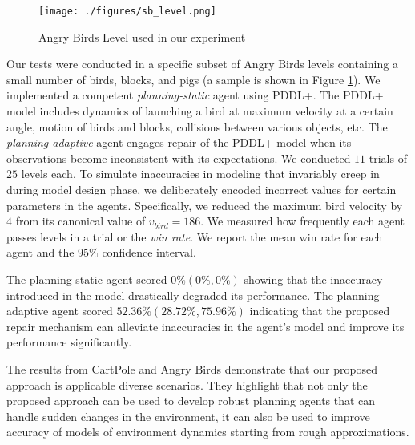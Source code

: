 \documentclass[letterpaper]{article} %
\begin{document}
\begin{figure}
    \centering
    \texttt{[image: ./figures/sb\_level.png]}
    \caption{Angry Birds Level used in our experiment}
    \label{fig:ab_level}
\end{figure}


Our tests were conducted in a specific subset of Angry Birds levels containing a small number of birds, blocks, and pigs (a sample is shown in Figure \ref{fig:ab_level}). We implemented a competent \emph{planning-static} agent using PDDL+. The PDDL+ model includes dynamics of launching a bird at maximum velocity at a certain angle, motion of birds and blocks, collisions between various objects, etc. The \emph{planning-adaptive} agent engages repair of the PDDL+ model when its observations become inconsistent with its expectations. We conducted $11$ trials of $25$ levels each. To simulate inaccuracies in modeling that invariably creep in during model design phase, we deliberately encoded incorrect values for certain parameters in the agents. Specifically, we reduced the maximum bird velocity by $4$ from its canonical value of $v_{bird}=186$. We measured how frequently each agent passes levels in a trial or the \emph{win rate}.
We report the mean win rate for each agent and the $95\%$ confidence interval.

The planning-static agent scored $0\% (0\%, 0\%)$ showing that the inaccuracy introduced in the model drastically degraded its performance. The planning-adaptive agent scored $52.36\% (28.72\%, 75.96\%)$ indicating that the proposed repair mechanism can alleviate inaccuracies in the agent's model and improve its performance significantly.


The results from CartPole and Angry Birds demonstrate that our proposed approach is applicable diverse scenarios. They highlight that not only the proposed approach can be used to develop robust planning agents that can handle sudden changes in the environment, it can also be used to improve accuracy of models of environment dynamics starting from rough approximations.
\end{document}
